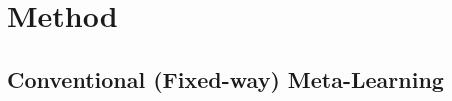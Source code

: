 \documentclass[letterpaper]{article} %
\newcommand{\jh}[1]{\textcolor{blue}{#1}}
\newcommand{\yr}[1]{\textcolor{magenta}{#1}}
\begin{document}
\section{Method}
\subsection{Conventional (Fixed-way) Meta-Learning}
\end{document}
